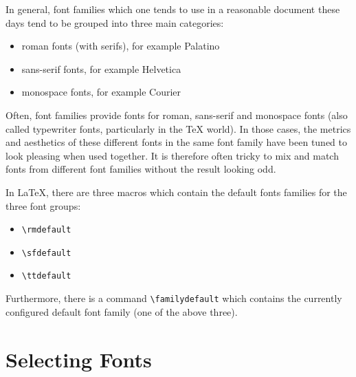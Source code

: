 \documentclass[a4paper,oneside,11pt]{article}
\newcommand\comm[1]{\texttt{\textbackslash#1}}
\begin{document}
In general,  font families  which one  tends to use  in a  reasonable document
these days tend to be grouped into three main categories\footnotemark:


\begin{itemize}
    \item {\selectfont roman fonts (with serifs), for example Palatino}
    \item {\selectfont sans-serif fonts, for example Helvetica}
    \item {\selectfont monospace fonts, for example Courier}
\end{itemize}

Often, font families  provide fonts for roman, sans-serif  and monospace fonts
(also called  typewriter fonts,  particularly in  the \TeX{}  world). In those
cases, the  metrics and aesthetics of  these different fonts in  the same font
family have  been tuned to look  pleasing when used together. It  is therefore
often tricky to  mix and match fonts from different  font families without the
result looking odd\footnotemark.


In \LaTeX, there are three macros which contain the default fonts families for
the three font groups:

\begin{itemize}
    \item \comm{rmdefault}
    \item \comm{sfdefault}
    \item \comm{ttdefault}
\end{itemize}

Furthermore,  there  is  a  command \comm{familydefault}  which  contains  the
currently configured default font family (one of the above three).


\section{Selecting Fonts}
\label{sec:setting-fonts}
\end{document}
